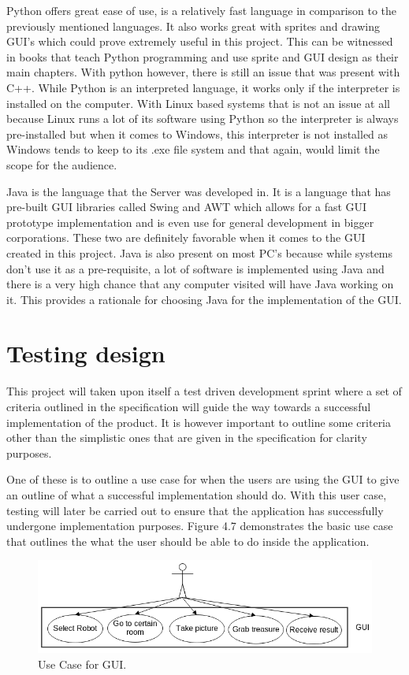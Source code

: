 \documentclass{report}
\begin{document}
        Python offers great ease of use, is a relatively fast language in comparison to the previously mentioned languages. It also works great with sprites and drawing GUI’s which could prove extremely useful in this project. This can be witnessed in books that teach Python programming and use sprite and GUI design as their main chapters\cite{python}. With python however, there is still an issue that was present with C++. While Python is an interpreted language, it works only if the interpreter is installed on the computer. With Linux based systems that is not an issue at all because Linux runs a lot of its software using Python so the interpreter is always pre-installed but when it comes to Windows, this interpreter is not installed as Windows tends to keep to its .exe file system and that again, would limit the scope for the audience.

        Java is the language that the Server was developed in. It is a language that has pre-built GUI libraries called Swing and AWT which allows for a fast GUI prototype implementation and is even use for general development in bigger corporations. These two are definitely favorable when it comes to the GUI created in this project. Java is also present on most PC’s because while systems don't use it as a pre-requisite, a lot of software is implemented using Java and there is a very high chance that any computer visited will have Java working on it. This provides a rationale for choosing Java for the implementation of the GUI.

    \section{Testing design}
      This project will taken upon itself a test driven development sprint where a set of criteria outlined in the specification will guide the way towards a successful implementation of the product. It is however important to outline some criteria other than the simplistic ones that are given in the specification for clarity purposes.

      One of these is to outline a use case for when the users are using the GUI to give an outline of what a successful implementation should do. With this user case, testing will later be carried out to ensure that the application has successfully undergone implementation purposes. Figure 4.7 demonstrates the basic use case that outlines the what the user should be able to do inside the application.

        \begin{figure}[!ht]  
          \centering
            \includegraphics[width=1\textwidth]{figures/GuiUseCase2.png}
            \caption{Use Case for GUI.}
        \end{figure}
\end{document}
